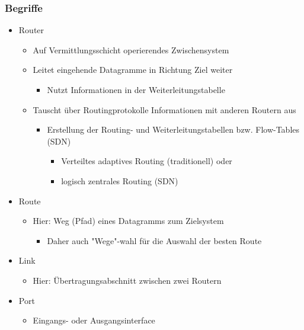     \subsubsection{Begriffe}
      \begin{itemize}
        \item Router
          \begin{itemize}
            \item Auf Vermittlungsschicht operierendes Zwischensystem
            \item Leitet eingehende Datagramme in Richtung Ziel weiter
              \begin{itemize}
                \item Nutzt Informationen in der Weiterleitungstabelle
              \end{itemize}
            \item Tauscht über Routingprotokolle Informationen mit anderen Routern aus
              \begin{itemize}
                \item Erstellung der Routing- und Weiterleitungstabellen bzw. Flow-Tables (SDN)
                  \begin{itemize}
                    \item Verteiltes adaptives Routing (traditionell) oder
                    \item logisch zentrales Routing (SDN)
                  \end{itemize}
              \end{itemize}
          \end{itemize}
        \item Route
          \begin{itemize}
            \item Hier: Weg (Pfad) eines Datagramms zum Zielsystem
              \begin{itemize}
                \item Daher auch "Wege"-wahl für die Auswahl der besten Route
              \end{itemize}
          \end{itemize}
        \item Link
          \begin{itemize}
            \item Hier: Übertragungsabschnitt zwischen zwei Routern
          \end{itemize}
        \item Port
          \begin{itemize}
            \item Eingangs- oder Ausgangsinterface
          \end{itemize}
      \end{itemize}
